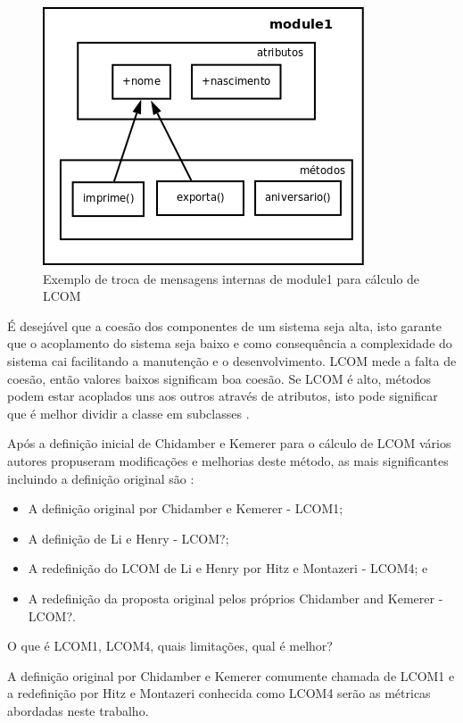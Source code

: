 \begin{figure}[h]
\center
\includegraphics[scale=0.4]{imagens/exemplo-lcom}
\caption{Exemplo de troca de mensagens internas de module1 para cálculo de LCOM}
\label{fig:exemplo-lcom}
\end{figure}

É desejável que a coesão dos componentes de um sistema seja alta, isto garante
que o acoplamento do sistema seja baixo e como consequência a complexidade do
sistema cai facilitando a manutenção e o desenvolvimento. LCOM mede a falta de
coesão, então valores baixos significam boa coesão. Se LCOM é alto, métodos podem
estar acoplados uns aos outros através de atributos, isto pode significar que é
melhor dividir a classe em subclasses \cite{observationsOnLCOM}.

Após a definição inicial de Chidamber e Kemerer para o cálculo de LCOM vários
autores propuseram modificações e melhorias deste método, as mais significantes
incluindo a definição original são \cite{principalComponentAnalysisOfLCOM}:

\begin{itemize}
\item A definição original por Chidamber e Kemerer - LCOM1;
\item A definição de Li e Henry - LCOM?;
\item A redefinição do LCOM de Li e Henry por Hitz e Montazeri - LCOM4; e
\item A redefinição da proposta original pelos próprios Chidamber and Kemerer - LCOM?.
\end{itemize}

O que é LCOM1, LCOM4, quais limitações, qual é melhor?

A definição original por Chidamber e Kemerer comumente chamada de LCOM1 e a
redefinição por Hitz e Montazeri conhecida como LCOM4 serão as métricas
abordadas neste trabalho.

